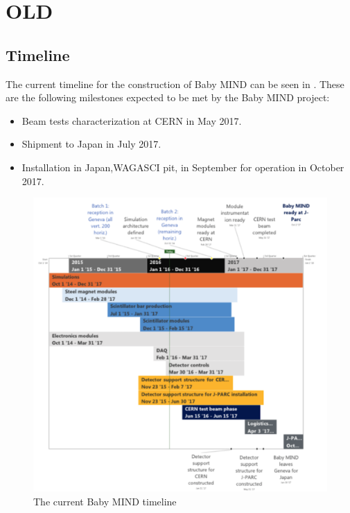 
\fi

\section{OLD}
\subsection{Timeline}
The current timeline for the construction of Baby MIND can be seen in .
These are the following milestones expected to be met by the Baby MIND project:
\begin{itemize}
\item Beam tests characterization at CERN in May 2017.
\item Shipment to Japan in July 2017.
\item Installation in Japan,WAGASCI pit, in September for operation in October 2017.
\end{itemize}

\begin{figure}[h!]
\centering
\includegraphics[width=\textwidth]{figures/timeline.png}
\caption{The current Baby MIND timeline}
\label{fig:timeline}
\end{figure}


